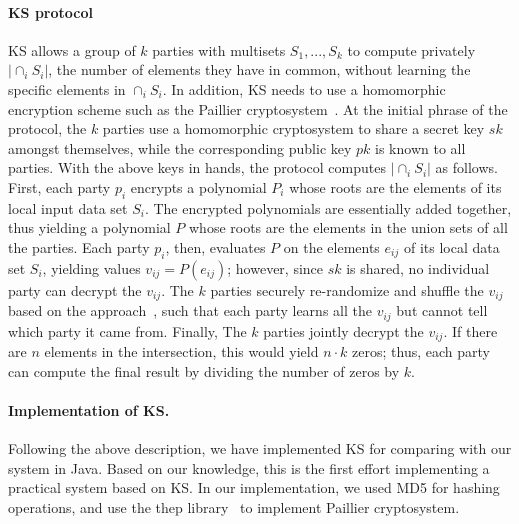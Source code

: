 \paragraph{KS protocol}
KS allows a group of $k$ parties with
multisets $S_1,...,S_k$ to compute privately $|\cap_i S_i|$, the number
of elements they have in common,
without learning the specific elements in $\cap_i S_i$.
In addition, KS needs to use a homomorphic encryption
scheme such as the Paillier cryptosystem~\cite{paillier99public}.
At the initial phrase of the protocol, 
the $k$ parties use a homomorphic cryptosystem
to share a secret key $sk$ amongst themselves, while the
corresponding public key $pk$ is known to all parties.
With the above keys in hands, the protocol computes $|\cap_i S_i|$
as follows.  
First, each party $p_i$ encrypts a polynomial $P_i$ whose
roots are the elements of its local input data set $S_i$.
The encrypted polynomials are essentially added together, thus
yielding a polynomial $P$ whose roots are the elements in the
union sets of all the parties.
Each party $p_i$, then, evaluates $P$ on the elements $e_{ij}$ of its
local data set $S_i$, yielding values $v_{ij} = P(e_{ij})$; however,
since $sk$ is shared, no individual party can decrypt the $v_{ij}$.
The $k$ parties securely re-randomize and shuffle the $v_{ij}$ based on
the approach~\cite{neff01verifiable}, such that each party 
learns all the $v_{ij}$
but cannot tell which party it came from.
Finally, The $k$ parties jointly decrypt the $v_{ij}$.  
If there are $n$ elements in
the intersection, this would yield $n \cdot k$ zeros; thus, each party
can compute the final result by dividing the number of 
zeros by $k$.

\paragraph{Implementation of KS.}
Following the above description, we have implemented 
KS for comparing with our system in Java.  
Based on our knowledge, this is the first effort
implementing a practical system based on KS.
In our implementation, we used MD5 for hashing operations,
and use the thep library~\cite{thep} to implement
Paillier cryptosystem.
